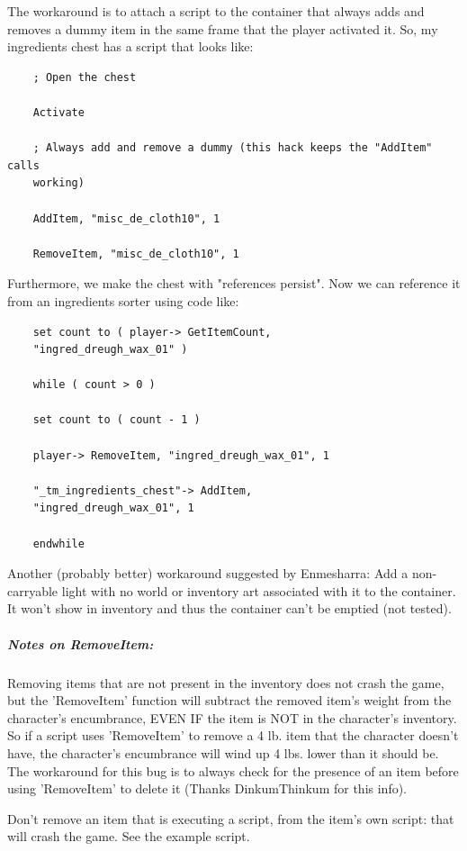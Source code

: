 The workaround is to attach a script to the container that always adds
and removes a dummy item in the same frame that the player activated it.
So, my ingredients chest has a script that looks like:

\begin{lstlisting}
	; Open the chest
	
	Activate
	
	; Always add and remove a dummy (this hack keeps the "AddItem" calls
	working)
	
	AddItem, "misc_de_cloth10", 1
	
	RemoveItem, "misc_de_cloth10", 1
\end{lstlisting}

Furthermore, we make the chest with "references persist". Now we can
reference it from an ingredients sorter using code like:

\begin{lstlisting}
	set count to ( player-> GetItemCount,
	"ingred_dreugh_wax_01" )
	
	while ( count > 0 )
	
	set count to ( count - 1 )
	
	player-> RemoveItem, "ingred_dreugh_wax_01", 1
	
	"_tm_ingredients_chest"-> AddItem,
	"ingred_dreugh_wax_01", 1
	
	endwhile
\end{lstlisting}

Another (probably better) workaround suggested by Enmesharra: Add a
non-carryable light with no world or inventory art associated with it to
the container. It won't show in inventory and thus the container can't
be emptied (not tested).

\hypertarget{notes-on-removeitem}{%
\subparagraph{Notes on RemoveItem:}\label{notes-on-removeitem}}

Removing items that are not present in the inventory does not crash the
game, but the 'RemoveItem' function will subtract the removed item's
weight from the character's encumbrance, EVEN IF the item is NOT in the
character's inventory. So if a script uses 'RemoveItem' to remove a 4
lb. item that the character doesn't have, the character's encumbrance
will wind up 4 lbs. lower than it should be. The workaround for this bug
is to always check for the presence of an item before using 'RemoveItem'
to delete it (Thanks DinkumThinkum for this info).

Don't remove an item that is executing a script, from the item's own
script: that will crash the game. See the example script.

